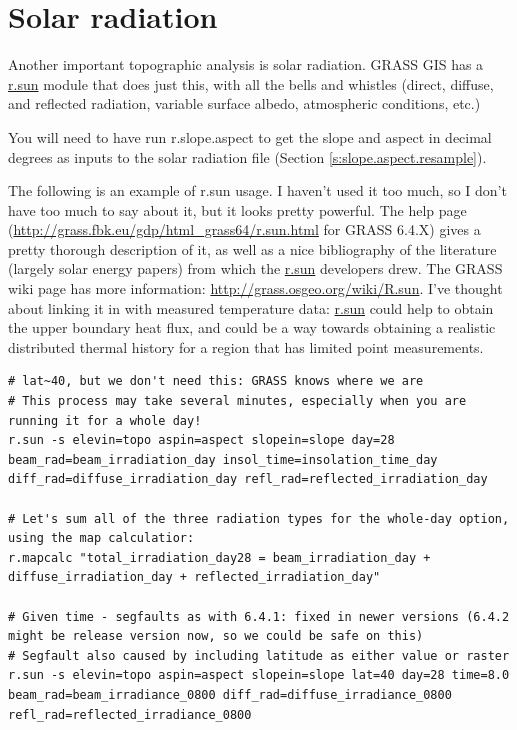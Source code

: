 \documentclass{book}
\begin{document}
\section{Solar radiation}
Another important topographic analysis is solar radiation. GRASS GIS has a \url{r.sun} module that does just this, with all the bells and whistles (direct, diffuse, and reflected radiation, variable surface albedo, atmospheric conditions, etc.)

You will need to have run r.slope.aspect to get the slope and aspect in decimal degrees as inputs to the solar radiation file (Section \ref{s:slope.aspect.resample}).

The following is an example of r.sun usage. I haven't used it too much, so I don't have too much to say about it, but it looks pretty powerful. The help page (\url{http://grass.fbk.eu/gdp/html_grass64/r.sun.html} for GRASS 6.4.X) gives a pretty thorough description of it, as well as a nice bibliography of the literature (largely solar energy papers) from which the \url{r.sun} developers drew. The GRASS wiki page has more information: \url{http://grass.osgeo.org/wiki/R.sun}. I've thought about linking it in with measured temperature data: \url{r.sun} could help to obtain the upper boundary heat flux, and could be a way towards obtaining a realistic distributed thermal history for a region that has limited point measurements.

\begin{lstlisting}
# lat~40, but we don't need this: GRASS knows where we are 
# This process may take several minutes, especially when you are running it for a whole day!
r.sun -s elevin=topo aspin=aspect slopein=slope day=28 beam_rad=beam_irradiation_day insol_time=insolation_time_day diff_rad=diffuse_irradiation_day refl_rad=reflected_irradiation_day

# Let's sum all of the three radiation types for the whole-day option, using the map calculatior:
r.mapcalc "total_irradiation_day28 = beam_irradiation_day + diffuse_irradiation_day + reflected_irradiation_day"

# Given time - segfaults as with 6.4.1: fixed in newer versions (6.4.2 might be release version now, so we could be safe on this)
# Segfault also caused by including latitude as either value or raster
r.sun -s elevin=topo aspin=aspect slopein=slope lat=40 day=28 time=8.0 beam_rad=beam_irradiance_0800 diff_rad=diffuse_irradiance_0800 refl_rad=reflected_irradiance_0800
\end{lstlisting}
\end{document}
